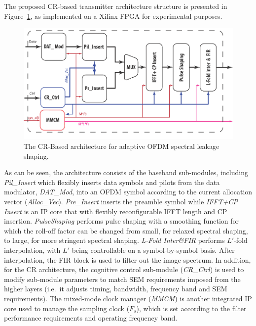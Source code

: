 The proposed CR-based transmitter architecture structure is presented in Figure~\ref{fig:Struc}, as implemented on a Xilinx FPGA for experimental purposes.
\begin{figure}[t]
    \centerline{\includegraphics [width=0.9\columnwidth] {Figures/CRTx_shaping} }
	\vspace{-2mm}
    \caption{The CR-Based architecture for adaptive OFDM spectral leakage shaping.}
    \label{fig:Struc}
\end{figure}
As can be seen, the architecture consists of the baseband sub-modules, including %
\emph{Pil\_Insert} which flexibly inserts data symbols and pilots from the data modulator, \emph{DAT\_Mod}, into an OFDM symbol according to the current allocation vector (\emph{Alloc\_Vec}).
\emph{Pre\_Insert} inserts the preamble symbol while \emph{IFFT+CP Insert} is an IP core that with flexibly reconfigurable IFFT length and CP insertion.
\emph{PulseShaping} performs pulse shaping with a smoothing function for which the roll-off factor can be changed from small, for relaxed spectral shaping, to large, for more stringent spectral shaping.
\emph{L-Fold Inter\&FIR} performs $L'$-fold interpolation, with $L'$ being controllable on a symbol-by-symbol basis. After interpolation, the FIR block is used to filter out the image spectrum.
In addition, for the CR architecture, the cognitive control sub-module (\emph{CR\_Ctrl}) is used to modify sub-module parameters to match SEM requirements imposed from the higher layers (i.e.\ it adjusts timing, bandwidth, frequency band and SEM requirements).
The mixed-mode clock manager (\emph{MMCM}) is another integrated IP core used to manage the sampling clock ($\mathit{F_s}$), which is set according to the filter performance requirements and operating frequency band.

